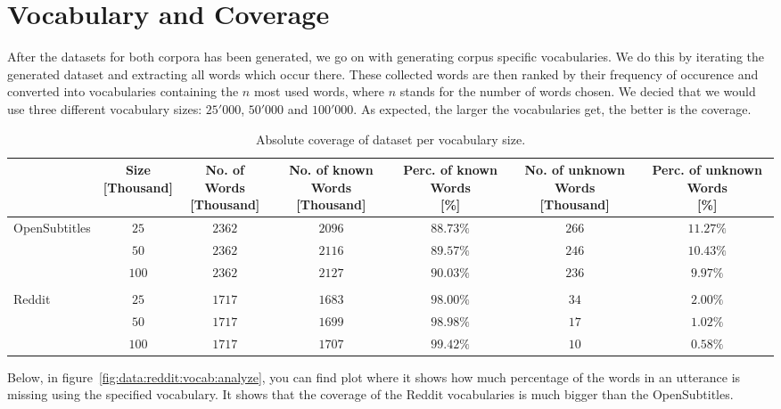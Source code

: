 \section{Vocabulary and Coverage}
After the datasets for both corpora has been generated, we go on with generating corpus specific vocabularies. We do this by iterating the generated dataset and extracting all words which occur there. These collected words are then ranked by their frequency of occurence and converted into vocabularies containing the $n$ most used words, where $n$ stands for the number of words chosen. We decied that we would use three different vocabulary sizes: $25'000$, $50'000$ and $100'000$. As expected, the larger the vocabularies get, the better is the coverage.
\\
\begin{table}[H]
	\begin{adjustbox}{max width=\textwidth}
		\centering
		\small
		\begin{tabular}{lcccccc}
			\toprule
			&\specialcell{Size\\ {[Thousand]}}
			&\specialcell{No. of Words\\ {[Thousand]}}
			&\specialcell{No. of known Words\\ {[Thousand]}}
			&\specialcell{Perc. of known Words \\ {[\%]}}
			&\specialcell{No. of unknown Words \\ {[Thousand]}}
			&\specialcell{Perc. of unknown Words \\ {[\%]}}\\
			\midrule
			OpenSubtitles	&$25$		&$2362$	&$2096$	&$88.73\%$ &$266$	&$11.27\%$\\
							&$50$		&$2362$	&$2116$	&$89.57\%$	&$246$	&$10.43\%$\\
							&$100$	&$2362$	&$2127$	&$90.03\%$	&$236$	&$9.97\%$\\\\
			Reddit		&$25$		&$1717$	&$1683$	&$98.00\%$	&$34$		&$2.00\%$\\
						&$50$		&$1717$	&$1699$	&$98.98\%$	&$17$		&$1.02\%$\\
						&$100$	&$1717$	&$1707$	&$99.42\%$	&$10$		&$0.58\%$\\
			\bottomrule
		\end{tabular}
	\end{adjustbox}
	\caption{Absolute coverage of dataset per vocabulary size.}
	\label{tbl:data:split:corpus:analyze}
\end{table}

Below, in figure~\ref{fig:data:reddit:vocab:analyze}, you can find plot where it shows how much percentage of the words in an utterance is missing using the specified vocabulary. It shows that the coverage of the Reddit vocabularies is much bigger than the OpenSubtitles.

